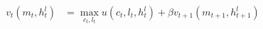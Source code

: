   \begin{align}
    v_t(m_t, h_t^l) &= \max _{c_t, l_t}u(c_t, l_t, h_t^l) + \beta v_{t+1}(m_{t+1}, h_{t+1}^l) \label{eq:bellman}
  \end{align}
